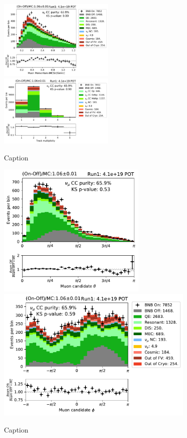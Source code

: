 \begin{figure}
    \centering
    \includegraphics[width=0.495\textwidth]{NuMuCCsel/Images/run1/numu_mcsmom_run1.pdf} \hfill
    \includegraphics[width=0.495\textwidth]{NuMuCCsel/Images/run1/numu_vtxntrack_cat_run1.pdf}
    \caption{Caption}
    \label{fig:numu_mcs}
\end{figure}

\begin{figure}
    \centering
    \includegraphics[height=6.5cm]{NuMuCCsel/Images/run1/numu_theta_run1.pdf} \hspace{2mm}
    \includegraphics[height=6.5cm]{NuMuCCsel/Images/run1/numu_phi_run1.pdf}
    \caption{Caption}
    \label{fig:numu_angles}
\end{figure}

